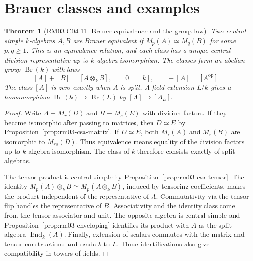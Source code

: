 \documentclass[11pt,oneside,openany]{book}
\newtheorem{theorem}{Theorem}[chapter]
\theoremstyle{definition}
\theoremstyle{remark}
\begin{document}
\section{Brauer classes and examples}

\begin{theorem}[RM03-C04.11. Brauer equivalence and the group law]
\label{thm:rm03-brauer-group}
Two central simple \(k\)-algebras \(A,B\) are \emph{Brauer
equivalent} if \(M_p(A)\simeq M_q(B)\) for some \(p,q\geq 1\).
This is an equivalence relation, and each class has a unique
central division representative up to \(k\)-algebra isomorphism.
The classes form an abelian group \(\operatorname{Br}(k)\)
with laws
\[
 [A]+[B]=[A\otimes_k B],\qquad 0=[k],\qquad -[A]=[A^{\mathrm{op}}].
\]
The class \([A]\) is zero exactly when \(A\) is split. A field
extension \(L/k\) gives a homomorphism
\(\operatorname{Br}(k)\to\operatorname{Br}(L)\) by \([A]\mapsto[A_L]\).
\end{theorem}
\begin{proof}
Write \(A=M_r(D)\) and \(B=M_s(E)\) with division factors.
If they become isomorphic after passing to matrices, then
\(D\simeq E\) by Proposition~\ref{prop:rm03-csa-matrix}.
If \(D\simeq E\), both \(M_s(A)\) and \(M_r(B)\) are
isomorphic to \(M_{rs}(D)\). Thus equivalence means equality
of the division factors up to \(k\)-algebra isomorphism. The
class of \(k\) therefore consists exactly of split algebras.

The tensor product is central simple by
Proposition~\ref{prop:rm03-csa-tensor}. The identity
\(M_p(A)\otimes_k B\simeq M_p(A\otimes_k B)\), induced by
tensoring coefficients, makes the product independent of
the representative of \(A\). Commutativity via the tensor
flip handles the representative of \(B\). Associativity and
the identity class come from the tensor associator and unit.
The opposite algebra is central simple and
Proposition~\ref{prop:rm03-enveloping} identifies its product
with \(A\) as the split algebra \(\operatorname{End}_k(A)\).
Finally, extension of scalars commutes with the matrix and
tensor constructions and sends \(k\) to \(L\). These
identifications also give compatibility in towers of fields.
\end{proof}
\end{document}
